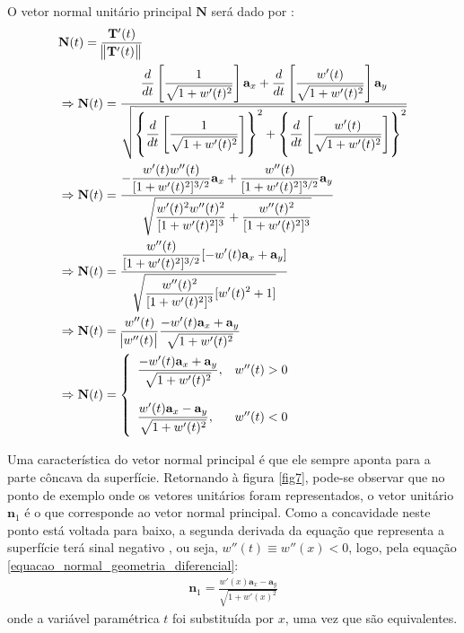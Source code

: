 O vetor normal unitário principal $\mathbf{N}$ será dado por \citep{livro_stewart_2}:
\begin{align}
& \mathbf{N}(t) = \frac{\mathbf{T}'(t)}{\norm{\mathbf{T}'(t)}} \nonumber \\
& \Rightarrow \mathbf{N}(t) = \frac{ \displaystyle\frac{d}{dt}\left[\frac{1}{\sqrt{1 + w'(t)^2}}\right]\mathbf{a}_x
	+
	\displaystyle\frac{d}{dt}\left[\frac{w'(t)}{\sqrt{1 + w'(t)^2}}\right]\mathbf{a}_y }
{\sqrt{ \left\lbrace \displaystyle\frac{d}{dt}\left[\frac{1}{\sqrt{1 + w'(t)^2}}\right] \right\rbrace ^2
		+
		\left\lbrace \displaystyle\frac{d}{dt}\left[\frac{w'(t)}{\sqrt{1 + w'(t)^2}}\right] \right\rbrace ^2 }} \nonumber \\
& \Rightarrow \mathbf{N}(t) = \frac{ -\displaystyle \frac{w'(t)w''(t)}{[1 + w'(t)^2]^{3/2}} \mathbf{a}_x
	+
	\displaystyle \frac{w''(t)}{[1 + w'(t)^2]^{3/2}} \mathbf{a}_y }
{\sqrt{ \displaystyle \frac{w'(t)^2 w''(t)^2}{[1 + w'(t)^2]^3} 
		+
		\displaystyle \frac{w''(t)^2}{[1 + w'(t)^2]^{3}} }} \nonumber \\
& \Rightarrow \mathbf{N}(t) = \frac{ \displaystyle\frac{w''(t)}{[1 + w'(t)^2]^{3/2}} [-w'(t)\mathbf{a}_x + \mathbf{a}_y] }
{\sqrt{ \displaystyle \frac{w''(t)^2}{[1 + w'(t)^2]^3} [w'(t)^2	+ 1] }} \nonumber \\
& \Rightarrow \mathbf{N}(t) = \frac{w''(t)}{\abs{w''(t)}} \frac{ -w'(t)\mathbf{a}_x + \mathbf{a}_y }
{\sqrt{ 1 + w'(t)^2 }} \nonumber \\
& \Rightarrow \mathbf{N}(t) = \left\lbrace\begin{array}{ll}
\displaystyle\frac{ -w'(t)\mathbf{a}_x + \mathbf{a}_y}{\sqrt{ 1 + w'(t)^2 }}, & w''(t) > 0 \\ \\
\displaystyle\frac{ w'(t)\mathbf{a}_x - \mathbf{a}_y}{\sqrt{ 1 + w'(t)^2 }}, & w''(t) < 0
\end{array}\right.
\label{equacao_normal_geometria_diferencial}
\end{align}

Uma característica do vetor normal principal é que ele sempre aponta para a parte côncava da superfície. Retornando à figura \ref{fig7}, pode-se observar que no ponto de exemplo onde os vetores unitários foram representados, o vetor unitário $\mathbf{n}_1$ é o que corresponde ao vetor normal principal. Como a concavidade neste ponto está voltada para baixo, a segunda derivada da equação que representa a superfície terá sinal negativo \cite{livro_stewart_1}, ou seja, $w''(t) \equiv w''(x) < 0$, logo, pela equação \eqref{equacao_normal_geometria_diferencial}:
\begin{align}
\mathbf{n}_1 = \frac{ w'(x)\mathbf{a}_x - \mathbf{a}_y }{\sqrt{ 1 + w'(x)^2 }} \label{equacao_normal_geometria_diferencial_1}
\end{align}
onde a variável paramétrica $t$ foi substituída por $x$, uma vez que são equivalentes.

